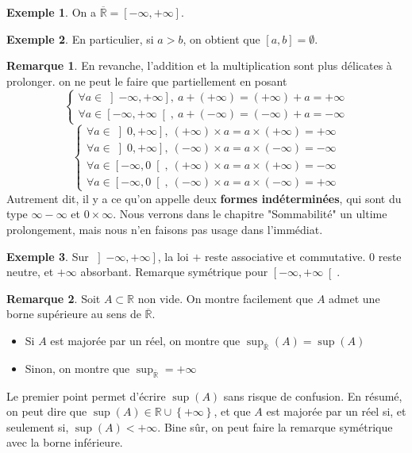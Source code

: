 \documentclass[french]{book}
\newcommand{\R}{\mathbb{R}}
\theoremstyle{plain}
\theoremstyle{definition}
\newtheorem{exa}{Exemple}[chapter]
\newtheorem{rmq}{Remarque}[chapter]
\theoremstyle{remark}
\begin{document}
\begin{exa}
	On a $\overline{\R}=\left[-\infty,+\infty\right]$.
\end{exa}
\begin{exa}
	En particulier, si $a>b$, on obtient que $\left[a,b\right]=\emptyset$.
\end{exa}
\begin{rmq}
	En revanche, l'addition et la multiplication sont plus délicates à prolonger. on ne peut le faire que partiellement en posant $$\left \{\begin{array}{ll}\forall a\in\left]-\infty,+\infty\right],\ a+(+\infty)=(+\infty)+a=+\infty \\ \forall a\in\left[-\infty,+\infty\right[,\ a+(-\infty)=(-\infty)+a=-\infty\end{array}\right.$$ $$\left \{\begin{array}{llll}\forall a\in\left]0,+\infty\right],\ (+\infty)\times a=a\times(+\infty)=+\infty \\ \forall a\in\left]0,+\infty\right],\ (-\infty)\times a=a\times(-\infty)=-\infty \\ \forall a\in\left[-\infty,0\right[,\ (+\infty)\times a=a\times(+\infty)=-\infty \\ \forall a\in\left[-\infty,0\right[,\ (-\infty)\times a=a\times(-\infty)=+\infty\end{array}\right.$$ Autrement dit, il y a ce qu'on appelle deux \textbf{formes indéterminées}, qui sont du type $\infty-\infty$ et $0\times \infty$. Nous verrons dans le chapitre "Sommabilité" un ultime prolongement, mais nous n'en faisons pas usage dans l'immédiat.
\end{rmq}
\begin{exa}
	Sur $\left]-\infty,+\infty\right]$, la loi $+$ reste associative et commutative. $0$ reste neutre, et $+\infty$ absorbant. Remarque symétrique pour $\left[-\infty,+\infty\right[$.
\end{exa}
\begin{rmq}
	Soit $A\subset\R$ non vide. On montre facilement que $A$ admet une borne supérieure au sens de $\overline{\R}$.
	\begin{itemize}
		\item Si $A$ est majorée par un réel, on montre que $\sup_{\overline{\R}}(A)=\sup(A)$
		\item Sinon, on montre que $\sup_{\overline{\R}}=+\infty$
	\end{itemize}
	Le premier point permet d'écrire $\sup(A)$ sans risque de confusion. En résumé, on peut dire que $\sup(A)\in\R\cup\left\{+\infty\right\}$, et que $A$ est majorée par un réel si, et seulement si, $\sup(A)<+\infty$. Bine sûr, on peut faire la remarque symétrique avec la borne inférieure.
\end{rmq}
\end{document}
